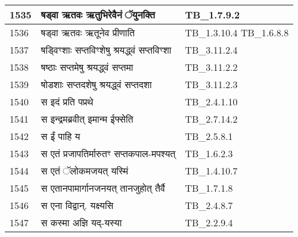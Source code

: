 \documentclass[17pt]{extarticle}
\begin{document}
\begin{longtable}{||p{0.4in}||p{4.9in}||p{0.9in}||}
    \hline
        
    1535 & षड्वा ऋतवः ऋतुभिरेवैनं ॅयुनक्ति & TB\_1.7.9.2       \\
    
    \hline
        
    1536 & षड्वा ऋतवः ऋतूनेव प्रीणाति & TB\_1.3.10.4 TB\_1.6.8.8       \\
    
    \hline
        
    1537 & षड्विꣳशाः सप्तविꣳशेषु श्रयद्ध्वं सप्तविꣳशा & TB\_3.11.2.4       \\
    
    \hline
        
    1538 & षष्ठाः सप्तमेषु श्रयद्ध्वं सप्तमा & TB\_3.11.2.2       \\
    
    \hline
        
    1539 & षोडशाः सप्तदशेषु श्रयद्ध्वं सप्तदशा & TB\_3.11.2.3       \\
    
    \hline
        
    1540 & स इदं प्रति पप्रथे & TB\_2.4.1.10       \\
    
    \hline
        
    1541 & स इन्द्रमब्रवीत् इमान्म ईफ्सेति & TB\_2.7.14.2       \\
    
    \hline
        
    1542 & स ईं पाहि य & TB\_2.5.8.1       \\
    
    \hline
        
    1543 & स एतं प्रजापतिर्मारुतꣳ सप्तकपाल{-}मपश्यत् & TB\_1.6.2.3       \\
    
    \hline
        
    1544 & स एतं ॅलोकमजयत् यस्मिं & TB\_1.4.10.7       \\
    
    \hline
        
    1545 & स एतानपामार्गानजनयत् तानजुहोत् तैर्वै & TB\_1.7.1.8       \\
    
    \hline
        
    1546 & स एना विद्वान्. यक्ष्यसि & TB\_2.4.8.7       \\
    
    \hline
        
    1547 & स कस्मा अज्ञि यद्{-}यस्या & TB\_2.2.9.4       \\
    

\end{longtable}
\end{document}
